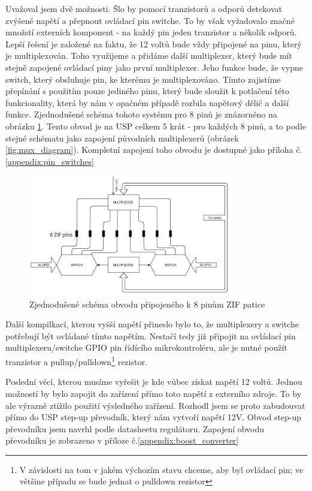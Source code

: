 \documentclass[11pt,a4paper,twoside,openright]{report}
\begin{document}
Uvažoval jsem dvě možnosti. Šlo by pomocí tranzistorů a odporů detekovat zvýšené napětí a přepnout ovládací pin switche. To by však vyžadovalo značné množstí externích komponent - na každý pin jeden tranzistor a několik odporů. Lepší řešení je založené na faktu, že 12 voltů bude vždy připojené na pinu, který je multiplexován. Toho využijeme a přidáme další multiplexer, který bude mít stejně zapojené ovládací piny jako první multiplexer. Jeho funkce bude, že vypne switch, který obsluhuje pin, ke kterému je multiplexováno. Tímto zajistíme přepínání s použitím pouze jediného pinu, který bude sloužit k potlačení této funkcionality, která by nám v opačném případě rozbila napětový dělič a další funkce. Zjednodušené schéma tohoto systému pro 8 pinů je znázorněno na obrázku \ref{fig:simplified_pin_switches}. Tento obvod je na USP celkem 5 krát - pro každých 8 pinů, a to podle stejné schématu jako zapojení původních multiplexerů (obrázek \ref{fig:mux_diagram}). Kompletní zapojení toho obvodu je dostupné jako příloha č.\ref{appendix:pin_switches}

\begin{figure}[ht!]
  \includegraphics[width=0.8\textwidth]{img/simplified_pin_switches.png}
  \centering
  \caption{Zjednodušené schéma obvodu připojeného k 8 pinům ZIF patice}
  \label{fig:simplified_pin_switches}
\end{figure}

Další kompilkací, kterou vyšší napětí přineslo bylo to, že multiplexery a switche potřebují být ovládané tímto napětím. Nestačí tedy již připojit na ovládací pin multiplexeru/switche GPIO pin řídícího mikrokontroléru, ale je nutné použít tranzistor a pullup/pulldown\footnote{V závislosti na tom v jakém výchozím stavu chceme, aby byl ovládací pin; ve většine případu se bude jednat o pulldown rezistor} rezistor.

Poslední věcí, kterou musíme vyřešit je kde vůbec získat napětí 12 voltů. Jednou možností by bylo zapojit do zařízení přímo toto napětí z externího zdroje. To by ale výrazně ztížilo použití výsledného zařízení. Rozhodl jsem se proto zabudouvat přímo do USP step-up převodník, který nám vytvoří napětí 12V. Obvod step-up převodníku jsem navrhl podle datasheetu regulátoru\cite{step-up}. Zapojení obvodu převodníku je zobrazeno v příloze č.\ref{appendix:boost_converter}
\end{document}
